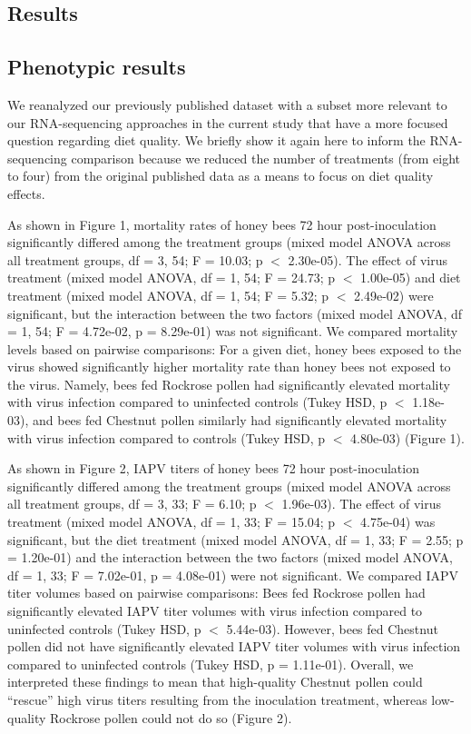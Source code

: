 \documentclass{bmcart}
\begin{document}
\begin{linenumbers}
\begin{doublespacing}
\section*{Results}

\subsection*{Phenotypic results}

We reanalyzed our previously published dataset with a subset more relevant to our RNA-sequencing approaches in the current study that have a more focused question regarding diet quality. We briefly show it again here to inform the RNA-sequencing comparison because we reduced the number of treatments (from eight to four) from the original published data \cite{adamInt} as a means to focus on diet quality effects.

As shown in Figure 1, mortality rates of honey bees 72 hour post-inoculation significantly differed among the treatment groups (mixed model ANOVA across all treatment groups, df = 3, 54; F = 10.03; p $<$ 2.30e-05). The effect of virus treatment (mixed model ANOVA, df = 1, 54; F = 24.73; p $<$ 1.00e-05) and diet treatment (mixed model ANOVA, df = 1, 54; F = 5.32; p $<$ 2.49e-02) were significant, but the interaction between the two factors (mixed model ANOVA, df = 1, 54; F = 4.72e-02, p = 8.29e-01) was not significant. We compared mortality levels based on pairwise comparisons: For a given diet, honey bees exposed to the virus showed significantly higher mortality rate than honey bees not exposed to the virus. Namely, bees fed Rockrose pollen had significantly elevated mortality with virus infection compared to uninfected controls (Tukey HSD, p $<$ 1.18e-03), and bees fed Chestnut pollen similarly had significantly elevated mortality with virus infection compared to controls (Tukey HSD, p $<$ 4.80e-03) (Figure 1).

As shown in Figure 2, IAPV titers of honey bees 72 hour post-inoculation significantly differed among the treatment groups (mixed model ANOVA across all treatment groups, df = 3, 33; F = 6.10; p $<$ 1.96e-03). The effect of virus treatment (mixed model ANOVA, df = 1, 33; F = 15.04; p $<$ 4.75e-04) was significant, but the diet treatment (mixed model ANOVA, df = 1, 33; F = 2.55; p = 1.20e-01) and the interaction between the two factors (mixed model ANOVA, df = 1, 33; F = 7.02e-01, p = 4.08e-01) were not significant. We compared IAPV titer volumes  based on pairwise comparisons: Bees fed Rockrose pollen had significantly elevated IAPV titer volumes with virus infection compared to uninfected controls (Tukey HSD, p $<$ 5.44e-03). However, bees fed Chestnut pollen did not have significantly elevated IAPV titer volumes with virus infection compared to uninfected controls (Tukey HSD, p = 1.11e-01). Overall, we interpreted these findings to mean that high-quality Chestnut pollen could ``rescue'' high virus titers resulting from the inoculation treatment, whereas low-quality Rockrose pollen could not do so (Figure 2).


\end{doublespacing}
\end{linenumbers}
\end{document}
